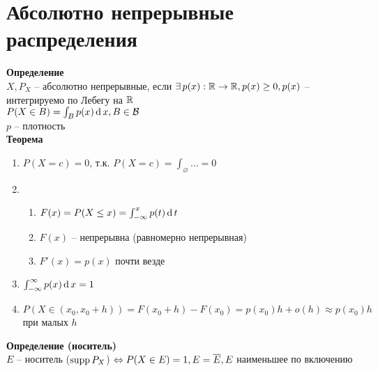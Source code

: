 \documentclass[12pt]{article}
\begin{document}
\section{Абсолютно непрерывные распределения}
\textbf{Определение}\\
$X, P_X$ -- абсолютно непрерывные, если $\exists\, p(x): \mathbb{R} \rightarrow \mathbb{R}, p(x) \geq 0, p(x)$ -- интегрируемо по Лебегу на $\mathbb{R}$\\
$P(X \in B) = \int_B p(x)\operatorname{d} x, B \in \mathcal{B}$\\
$p$ -- плотность\\
\textbf{Теорема}\\
\begin{enumerate}
    \item $P(X = c) = 0$, т.к. $P(X = c) = \int_\varnothing \ldots = 0$
    \item \begin{enumerate}
        \item $F(x) = P(X \leq x) = \int_{-\infty}^x p(t) \operatorname{d} t$
        \item $F(x)$ -- непрерывна (равномерно непрерывная)
        \item $F'(x) = p(x)$ почти везде
    \end{enumerate}
    \item $\int_{-\infty}^\infty p(x)\operatorname{d} x = 1$
    \item $P(X \in (x_0, x_0 + h)) = F(x_0+h) - F(x_0) = p(x_0)h + o(h) \approx p(x_0)h$ при малых $h$
\end{enumerate}
\textbf{Определение (носитель)}\\
$E$ -- носитель ($\operatorname{supp} P_X$) $\Leftrightarrow P(X \in E) = 1, E = \overline E, E$ наименьшее по включению\\
\end{document}
